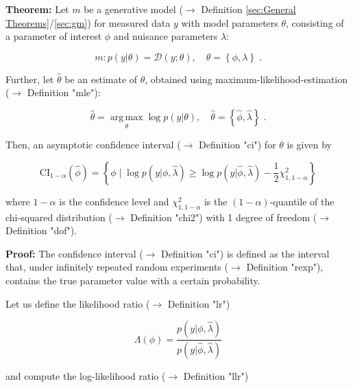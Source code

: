 \documentclass[a4paper,12pt]{book}
\begin{document}
\vspace{1em}
\textbf{Theorem:} Let $m$ be a generative model ($\rightarrow$ Definition \ref{sec:General Theorems}/\ref{sec:gm}) for measured data $y$ with model parameters $\theta$, consisting of a parameter of interest $\phi$ and nuisance parameters $\lambda$:

\begin{equation} \label{eq:ci-wilks-mod-par}
m: p(y|\theta) = \mathcal{D}(y; \theta), \quad \theta = \left\lbrace \phi, \lambda \right\rbrace \; .
\end{equation}

Further, let $\hat{\theta}$ be an estimate of $\theta$, obtained using maximum-likelihood-estimation ($\rightarrow$ Definition "mle"):

\begin{equation} \label{eq:ci-wilks-theta-mle}
\hat{\theta} = \operatorname*{arg\,max}_{\theta} \log p(y|\theta), \quad \hat{\theta} = \left\lbrace \hat{\phi}, \hat{\lambda} \right\rbrace \; .
\end{equation}

Then, an asymptotic confidence interval ($\rightarrow$ Definition "ci") for $\theta$ is given by

\begin{equation} \label{eq:ci-wilks-ci-wilks}
\mathrm{CI}_{1-\alpha}(\hat{\phi}) = \left\lbrace \phi \mid \log p(y|\phi,\hat{\lambda}) \geq \log p(y|\hat{\phi},\hat{\lambda}) - \frac{1}{2} \chi^2_{1,1-\alpha} \right\rbrace
\end{equation}

where $1-\alpha$ is the confidence level and $\chi^2_{1,1-\alpha}$ is the $(1-\alpha)$-quantile of the chi-squared distribution ($\rightarrow$ Definition "chi2") with 1 degree of freedom ($\rightarrow$ Definition "dof").


\vspace{1em}
\textbf{Proof:} The confidence interval ($\rightarrow$ Definition "ci") is defined as the interval that, under infinitely repeated random experiments ($\rightarrow$ Definition "rexp"), contains the true parameter value with a certain probability.

Let us define the likelihood ratio ($\rightarrow$ Definition "lr")

\begin{equation} \label{eq:ci-wilks-lr}
\Lambda(\phi) = \frac{p(y|\phi,\hat{\lambda})}{p(y|\hat{\phi},\hat{\lambda})}
\end{equation}

and compute the log-likelihood ratio ($\rightarrow$ Definition "llr")
\end{document}
